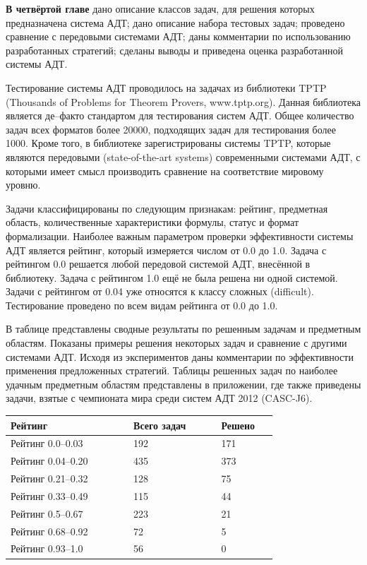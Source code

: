 \documentclass[a4paper]{report}
\begin{document}
\textbf{В четвёртой главе} дано описание классов задач, для решения которых предназначена система АДТ; дано описание набора тестовых задач; проведено сравнение с передовыми системами АДТ; даны комментарии по использованию разработанных стратегий; сделаны выводы и приведена оценка разработанной системы АДТ.

Тестирование системы АДТ проводилось на задачах из библиотеки TPTP (Thousands of Problems for Theorem Provers, www.tptp.org). Данная библиотека является де--факто стандартом для тестирования систем АДТ. Общее количество задач всех форматов более 20000, подходящих задач для тестирования более 1000. Кроме того,  в библиотеке зарегистрированы системы TPTP, которые являются передовыми (state-of-the-art systems) современными системами АДТ, с которыми имеет смысл производить сравнение на соответствие мировому уровню.

Задачи классифицированы по следующим признакам: рейтинг, предметная область, количественные характеристики формулы, статус и формат формализации. Наиболее важным параметром проверки эффективности системы АДТ является рейтинг, который измеряется числом от 0.0 до 1.0. Задача с рейтингом 0.0 решается любой передовой системой АДТ, внесённой в библиотеку. Задача с рейтингом 1.0 ещё не была решена ни одной системой. Задачи с рейтингом от 0.04 уже относятся к классу сложных (difficult). Тестирование проведено по всем видам рейтинга от 0.0 до 1.0.

В таблице представлены сводные результаты по решенным задачам и предметным областям. Показаны примеры решения некоторых задач и сравнение с другими системами АДТ. Исходя из экспериментов даны комментарии по эффективности применения предложенных стратегий. Таблицы решенных задач по наиболее удачным предметным областям представлены в приложении, где также приведены задачи, взятые с чемпионата мира среди систем АДТ 2012 (CASC-J6).



{\small{}
\begin{longtable}[H]{|p{0.35\linewidth}|p{0.25\linewidth}|p{0.15\linewidth}|}
\hline
\textbf{Рейтинг} & \textbf{Всего задач} & \textbf{Решено} \\
\hline
Рейтинг 0.0--0.03 & 192 & 171 \\
\hline
Рейтинг 0.04--0.20 & 435 & 373 \\
\hline
Рейтинг 0.21--0.32 & 128 & 75 \\
\hline
Рейтинг 0.33--0.49 & 115 & 44 \\
\hline
Рейтинг 0.5--0.67 & 223 & 21 \\
\hline
Рейтинг 0.68--0.92 & 72 & 5 \\
\hline
Рейтинг 0.93--1.0 & 56 & 0\\
\hline
\end{longtable}
}
\end{document}
